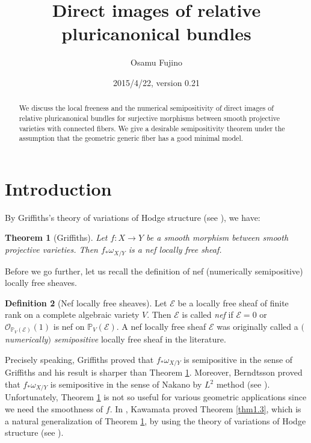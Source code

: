 \documentclass[12pt,twoside]{amsart}
\title{Direct images of relative pluricanonical bundles}
\author{Osamu Fujino}
\date{2015/4/22, version 0.21}
\newtheorem{thm}{Theorem}[section]
\theoremstyle{definition}
\newtheorem{defn}[thm]{Definition}
\begin{document}
\begin{abstract}
We discuss the local freeness and the 
numerical semipositivity of 
direct images of relative pluricanonical 
bundles for surjective morphisms between smooth projective varieties 
with connected fibers. 
We give a desirable semipositivity theorem under the 
assumption that 
the geometric generic fiber has a good minimal model. 
\end{abstract}

\maketitle

\tableofcontents 

\section{Introduction}\label{sec1}

By Griffiths's theory of variations of Hodge structure (see 
\cite{griffiths}), we have: 

\begin{thm}[Griffiths]\label{thm1.1} 
Let $f:X\to Y$ be a smooth morphism between smooth projective 
varieties. Then $f_*\omega_{X/Y}$ is a nef locally free 
sheaf. \end{thm}

Before we go further, 
let us recall the definition of nef (numerically semipositive) 
locally free sheaves. 
 
\begin{defn}[Nef locally free sheaves]\label{def1.2} 
Let $\mathcal E$ be a locally free sheaf of finite rank on a 
complete algebraic variety $V$. 
Then $\mathcal E$ is called {\em{nef}} if $\mathcal E=0$ or  
$\mathcal O_{\mathbb P_V(\mathcal E)}(1)$ is 
nef on $\mathbb P_V(\mathcal E)$. 
A nef locally free sheaf $\mathcal E$ 
was originally 
called a {\em{$($numerically$)$ semipositive}} locally free sheaf in the literature. 
\end{defn}

Precisely speaking, Griffiths proved that $f_*\omega_{X/Y}$ is 
semipositive in the sense of Griffiths and his result is sharper than 
Theorem \ref{thm1.1}. 
Moreover, Berndtsson proved that $f_*\omega_{X/Y}$ is 
semipositive in the sense of Nakano by $L^2$ method 
(see \cite[Theorem 1.2]{berndtsson}). 
Unfortunately, 
Theorem \ref{thm1.1} is not so useful for various geometric applications 
since we need the smoothness of $f$. 
In \cite{kawamata1}, Kawamata proved 
Theorem \ref{thm1.3}, which is a natural 
generalization of Theorem \ref{thm1.1}, by using 
the theory of variations of Hodge structure (see \cite[Theorem 5]{kawamata1}). 
\end{document}
